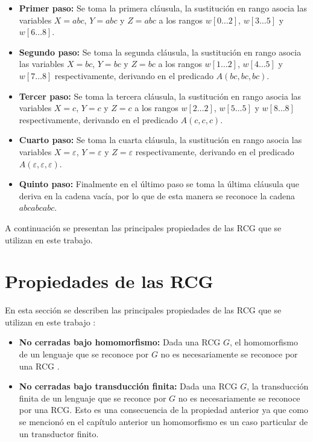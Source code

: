 \documentclass[12pt]{article}
\begin{document}
\begin{itemize}
    \item \textbf{Primer paso:} Se toma la primera cláusula, la sustitución en rango asocia las variables
          $X=abc$, $Y=abc$ y $Z=abc$ a los rangos $w[0\dots 2]$, $w[3\dots 5]$ y $w[6\dots 8]$.
    \item \textbf{Segundo paso:} Se toma la segunda cláusula, la sustitución en rango asocia las variables $X=bc$, $Y=bc$ y $Z=bc$ a los rangos $w[1\dots 2]$,
          $w[4\dots 5]$ y $w[7\dots 8]$ respectivamente, derivando en el predicado $A(bc,bc,bc)$.
    \item \textbf{Tercer paso:} Se toma la tercera cláusula, la sustitución en rango asocia las variables $X=c$, $Y=c$ y $Z=c$ a los
          rangos $w[2\dots 2]$, $w[5\dots 5]$ y $w[8\dots 8]$ respectivamente, derivando en el predicado $A(c,c,c)$.
    \item \textbf{Cuarto paso:} Se toma la cuarta cláusula, la sustitución en rango asocia las variables
          $X=\varepsilon$, $Y=\varepsilon$ y $Z=\varepsilon$ respectivamente, derivando en el predicado
          $A(\varepsilon,\varepsilon,\varepsilon)$.
    \item \textbf{Quinto paso:} Finalmente en el último paso se toma la última
          cláusula que deriva en la cadena vacía, por lo que de esta manera se reconoce la cadena $abcabcabc$.
\end{itemize}

A continuación se presentan las principales propiedades de las RCG que se utilizan en este trabajo.

\section{Propiedades de las RCG}

En esta sección se describen las principales propiedades de las RCG que se utilizan en este trabajo \cite{propertiesRCGBib}:
\begin{itemize}
    \item  \textbf{No cerradas bajo homomorfismo:} Dada una RCG $G$, el homomorfismo de un lenguaje que se reconoce por $G$ no es necesariamente se reconoce por una RCG \cite{propertiesRCGBib}.
    \item \textbf{No cerradas bajo transducción finita:} Dada una RCG $G$, la transducción finita de un lenguaje que se reconce por $G$ no es necesariamente se reconoce por una RCG.  Esto es una consecuencia de la propiedad anterior ya que como se mencionó en el capítulo anterior un homomorfismo es un caso particular de un transductor finito.
\end{itemize}
\end{document}
